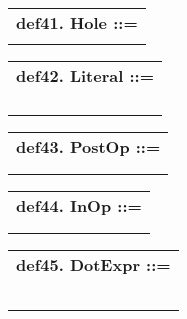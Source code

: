 \documentclass{report}
\begin{document}
\begin{tabular}{l}
{\bf def41. Hole ::= }\\ 
\hspace*{3mm}{\tt "?" {[}(Integer){]}} \\ 
\end{tabular}

\begin{tabular}{l}
{\bf def42. Literal ::= }\\ 
\hspace*{3mm}{\tt StringLiteral} \\ 
\hspace*{3mm}{\tt  $\mid$ NumberLiteral} \\ 
\hspace*{3mm}{\tt  $\mid$ ReservedLiteral} \\ 
\hspace*{3mm}{\tt  $\mid$ CharacterLiteral} \\ 
\end{tabular}

\begin{tabular}{l}
{\bf def43. PostOp ::= }\\ 
\hspace*{3mm}{\tt LexicalPostfixOperator} \\ 
\hspace*{3mm}{\tt  $\mid$ "@" DotExpr} \\ 
\end{tabular}

\begin{tabular}{l}
{\bf def44. InOp ::= }\\ 
\hspace*{3mm}{\tt LexicalInfixOperator} \\ 
\hspace*{3mm}{\tt  $\mid$ "@" DotExpr} \\ 
\end{tabular}

\begin{tabular}{l}
{\bf def45. DotExpr ::= }\\ 
\hspace*{3mm}{\tt Name} \\ 
\hspace*{3mm}{\tt  $\mid$ "(" Expr ")"} \\ 
\hspace*{3mm}{\tt  $\mid$ "return"} \\ 
\hspace*{3mm}{\tt  $\mid$ "throw"} \\ 
\hspace*{3mm}{\tt  $\mid$ "new"} \\ 
\end{tabular}
\end{document}
